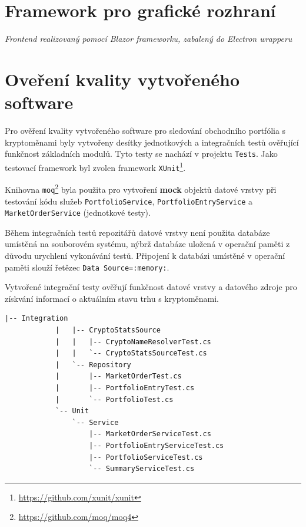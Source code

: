 \documentclass[12pt, a4paper]{article}
\begin{document}
    \section{Framework pro grafické rozhraní}
    \textit{Frontend realizovaný pomocí Blazor frameworku, zabalený do Electron wrapperu}


    \section{Oveření kvality vytvořeného software}

    Pro ověření kvality vytvořeného software pro sledování obchodního portfólia s kryptoměnami byly vytvořeny desítky jednotkových a integračních testů ověřující funkčnost základních modulů. Tyto testy se nachází v projektu \texttt{Tests}. Jako testovací framework byl zvolen framework \texttt{XUnit}\footnote{\url{https://github.com/xunit/xunit}}.

    Knihovna \texttt{moq}\footnote{\url{https://github.com/moq/moq4}} byla použita pro vytvoření \textbf{mock} objektů datové vrstvy při testování kódu služeb \texttt{PortfolioService}, \texttt{PortfolioEntryService} a \texttt{MarketOrderService} (jednotkové testy).

    Během integračních testů repozitářů datové vrstvy není použita databáze umístěná na souborovém systému, nýbrž databáze uložená v operační paměti z důvodu urychlení vykonávání testů. Připojení k databázi umístěné v operační paměti slouží řetězec \texttt{Data Source=:memory:}.

    Vytvořené integrační testy ověřují funkčnost datové vrstvy a datového zdroje pro získvání informací o aktuálním stavu trhu s kryptoměnami.

    \begin{lstlisting}[caption={Struktura projektu \texttt{Tests} obsahující integrační a jednotkové testy}, captionpos=b]
            |-- Integration
            |   |-- CryptoStatsSource
            |   |   |-- CryptoNameResolverTest.cs
            |   |   `-- CryptoStatsSourceTest.cs
            |   `-- Repository
            |       |-- MarketOrderTest.cs
            |       |-- PortfolioEntryTest.cs
            |       `-- PortfolioTest.cs
            `-- Unit
                `-- Service
                    |-- MarketOrderServiceTest.cs
                    |-- PortfolioEntryServiceTest.cs
                    |-- PortfolioServiceTest.cs
                    `-- SummaryServiceTest.cs
    \end{lstlisting}



    \printbibliography
\end{document}
